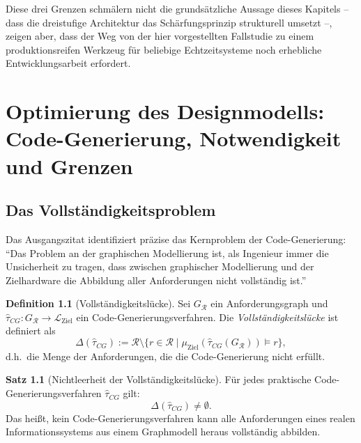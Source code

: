 ﻿\documentclass[a4paper,12pt]{report}
\theoremstyle{definition}
\newtheorem{definition}{Definition}[section]
\newtheorem{satz}{Satz}[section]
\begin{document}
\noindent
Diese drei Grenzen schmälern nicht die grundsätzliche Aussage dieses
Kapitels -- dass die dreistufige Architektur das Schärfungsprinzip
strukturell umsetzt --, zeigen aber, dass der Weg von der hier vorgestellten
Fallstudie zu einem produktionsreifen Werkzeug für beliebige
Echtzeitsysteme noch erhebliche Entwicklungsarbeit erfordert.

\chapter{Optimierung des Designmodells: Code-Generierung, Notwendigkeit und Grenzen}

\label{sec:codegen}

\section{Das Vollständigkeitsproblem}

Das Ausgangszitat identifiziert präzise das Kernproblem der Code-Generierung:
\enquote{Das Problem an der graphischen Modellierung ist, als Ingenieur immer die Unsicherheit
zu tragen, dass zwischen graphischer Modellierung und der Zielhardware die Abbildung aller
Anforderungen nicht vollständig ist.}

\begin{definition}[Vollständigkeitslücke]
\label{def:vollstaendigkeit}
Sei $G_\mathcal{R}$ ein Anforderungsgraph und $\hat{\tau}_{CG}: G_\mathcal{R} \to \mathcal{L}_{\text{Ziel}}$
ein Code-Generierungsverfahren. Die \emph{Vollständigkeitslücke} ist definiert als
\[
  \Delta(\hat{\tau}_{CG}) := \mathcal{R} \setminus \{r \in \mathcal{R} \mid
  \mu_{\text{Ziel}}(\hat{\tau}_{CG}(G_\mathcal{R})) \models r\},
\]
d.h.\ die Menge der Anforderungen, die die Code-Generierung nicht erfüllt.
\end{definition}

\begin{satz}[Nichtleerheit der Vollständigkeitslücke]
\label{satz:luecke}
Für jedes praktische Code-Generierungsverfahren $\hat{\tau}_{CG}$ gilt:
\[
  \Delta(\hat{\tau}_{CG}) \neq \emptyset.
\]
Das heißt, kein Code-Generierungsverfahren kann alle Anforderungen eines realen
Informationssystems aus einem Graphmodell heraus vollständig abbilden.
\end{satz}
\end{document}
